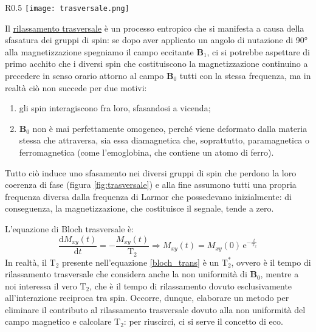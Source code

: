 \documentclass{report}
\newcommand{\figref}[1]{figura \ref{#1}}
\numberwithin{equation}{section}
\numberwithin{figure}{section}
\renewcommand{\Vec}{\bm}
\begin{document}
\begin{wrapfigure}{R}{0.5\textwidth}
    \centering
    \texttt{[image: trasversale.png]}
    \caption{\textit{Rappresentazione grafica del rilassamento trasversale con particolare attenzione alla perdita di coerenza di fase}.}
    \label{fig:trasversale}
\end{wrapfigure}

Il \underline{rilassamento trasversale} è un processo entropico che si manifesta a causa della sfasatura dei gruppi di spin: se dopo aver applicato un angolo di nutazione di 90° alla magnetizzazione spegniamo il campo eccitante $\Vec{B}_1$, ci si potrebbe aspettare di primo acchito che i diversi spin che costituiscono la magnetizzazione continuino a precedere in senso orario attorno al campo $\Vec{B}_0$ tutti con la stessa frequenza, ma in realtà ciò non succede per due motivi:
\begin{enumerate}
    \item gli spin interagiscono fra loro, sfasandosi a vicenda;
    \item $\Vec{B}_0$ non è mai perfettamente omogeneo, perché viene deformato dalla materia stessa che attraversa, sia essa diamagnetica che, soprattutto, paramagnetica o ferromagnetica (come l'emoglobina, che contiene un atomo di ferro).
\end{enumerate}
Tutto ciò induce uno sfasamento nei diversi gruppi di spin che perdono la loro coerenza di fase (\figref{fig:trasversale}) e alla fine assumono tutti una propria frequenza diversa dalla frequenza di Larmor che possedevano inizialmente: di conseguenza, la magnetizzazione, che costituisce il segnale, tende a zero.

\noindent L'equazione di Bloch trasversale è:
\begin{equation}\label{bloch_trans}
    \frac{\mathrm{d}M_{xy}(t)}{\mathrm{d}t}=-\frac{M_{xy}(t)}{\mathrm{T_2}} \Rightarrow \boxed{M_{xy}(t)=M_{xy}(0)\,\mathrm{e}^{-\frac{t}{\mathrm{T_2}}}}
\end{equation}
In realtà, il $\mathrm{T_2}$ presente nell'equazione \ref{bloch_trans} è un $\mathrm{T_2^*}$, ovvero è il tempo di rilassamento trasversale che considera anche la non uniformità di $\Vec{B}_0$, mentre a noi interessa il vero $\mathrm{T_2}$, che è il tempo di rilassamento dovuto esclusivamente all'interazione reciproca tra spin. Occorre, dunque, elaborare un metodo per eliminare il contributo al rilassamento trasversale dovuto alla non uniformità del campo magnetico e calcolare $\mathrm{T_2}$: per riuscirci, ci si serve il concetto di eco.
\end{document}
